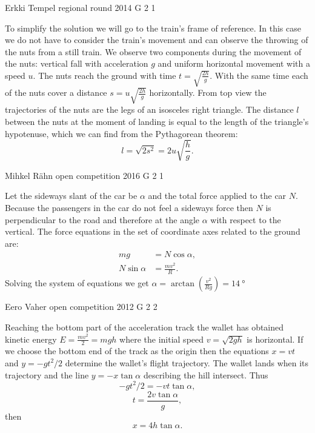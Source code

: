 \documentclass[11pt]{article}
\begin{document}
{Erkki Tempel} %
{regional round} %
{2014} %
{G 2} %
{1} %
{

\ifEngSolution
To simplify the solution we will go to the train’s frame of reference. In this case we do not have to consider the train’s movement and can observe the throwing of the nuts from a still train. We observe two components during the movement of the nuts: vertical fall with acceleration $g$ and uniform horizontal movement with a speed $u$. The nuts reach the ground with time $t=\sqrt{\frac{2h}{g}}$. With the same time each of the nuts cover a distance $s=u\sqrt{\frac{2h}{g}}$ horizontally. From top view the trajectories of the nuts are the legs of an isosceles right triangle. The distance $l$ between the nuts at the moment of landing is equal to the length of the triangle’s hypotenuse, which we can find from the Pythagorean theorem: 
\[ l=\sqrt{2s^2}=2u\sqrt{\frac{h}{g}}. \]
\fi
}

{Mihkel Rähn} %
{open competition} %
{2016} %
{G 2} %
{1} %
{

\ifEngSolution
Let the sideways slant of the car be $\alpha$ and the total force applied to the car $N$. Because the passengers in the car do not feel a sideways force then $N$ is perpendicular to the road and therefore at the angle $\alpha$ with respect to the vertical. The force equations in the set of coordinate axes related to the ground are: 
\begin{align*}
mg &= N\cos \alpha,\\
N\sin\alpha &= \frac{mv^2}{R}.
\end{align*}
Solving the system of equations we get $\alpha = \arctan(\frac{v^2}{Rg}) = \SI{14}{\degree}$
\fi
}

{Eero Vaher} %
{open competition} %
{2012} %
{G 2} %
{2} %
{

\ifEngSolution
Reaching the bottom part of the acceleration track the wallet has obtained kinetic energy $E=\frac{mv^2}{2}=mgh$ where the initial speed $v=\sqrt{2gh}$ is horizontal. If we choose the bottom end of the track as the origin then the equations $x=vt$ and $y=-gt^2 / 2$ determine the wallet’s flight trajectory. The wallet lands when its trajectory and the line $y=-x\tan\alpha$ describing the hill intersect. Thus
$$-gt^2 / 2=-vt\tan\alpha,$$
$$t=\frac{2v \tan \alpha}{g},$$
then $$x=4h \tan\alpha.$$
\fi
}
\end{document}
